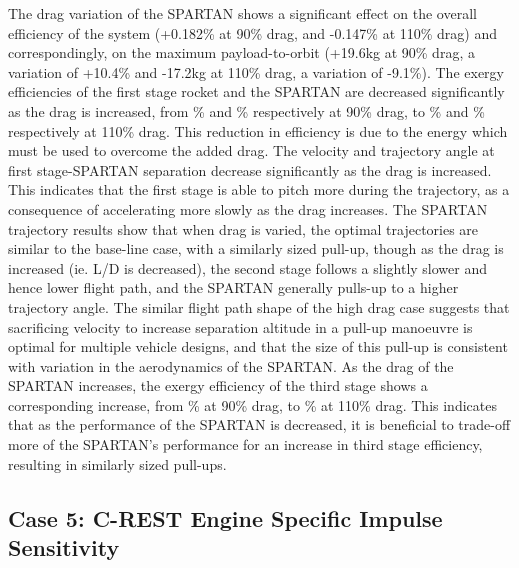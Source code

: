 The drag variation of the SPARTAN shows a significant effect on the overall efficiency of the system (+0.182\% at 90\% drag, and -0.147\% at 110\% drag) and correspondingly, on the maximum payload-to-orbit (+19.6kg at 90\% drag, a variation of +10.4\% and -17.2kg at 110\% drag, a variation of -9.1\%). The exergy efficiencies of the first stage rocket and the SPARTAN are decreased significantly as the drag is increased, from \firstExergyEffCdNinetyNoReturn\% and \secondExergyEffCdNinetyNoReturn\% respectively at 90\% drag, to \firstExergyEffCdOneHundredTenNoReturn\% and \secondExergyEffCdOneHundredTenNoReturn\% respectively at 110\% drag. This reduction in efficiency is due to the energy which must be used to overcome the added drag. 
The velocity and trajectory angle at first stage-SPARTAN separation decrease significantly as the drag is increased. This indicates that the first stage is able to pitch more during the trajectory, as a consequence of accelerating more slowly as the drag increases.
The SPARTAN trajectory results show that when drag is varied, the optimal trajectories are similar to the base-line case, with a similarly sized pull-up, though as the drag is increased (ie. L/D is decreased), the second stage follows a slightly slower and hence lower flight path, and the SPARTAN generally pulls-up to a higher trajectory angle. The similar flight path shape of the high drag case suggests that sacrificing velocity to increase separation altitude in a pull-up manoeuvre is optimal for multiple vehicle designs, and that the size of this pull-up is consistent with variation in the aerodynamics of the SPARTAN.
As the drag of the SPARTAN increases, the exergy efficiency of the third stage shows a corresponding increase, from \thirddExergyEffCdNinetyNoReturn\% at 90\% drag, to \thirddExergyEffCdOneHundredTenNoReturn\% at 110\% drag. This indicates that as the performance of the SPARTAN is decreased, it is beneficial to trade-off more of the SPARTAN's performance for an increase in third stage efficiency, resulting in similarly sized pull-ups. 


\subsection{Case 5: C-REST Engine Specific Impulse Sensitivity}

